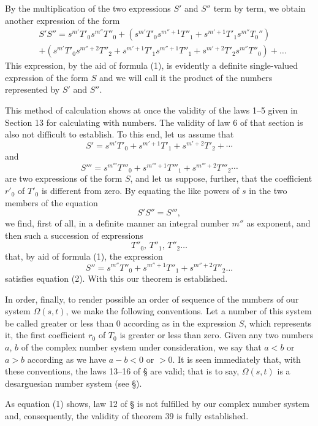 \documentclass[11pt,oneside]{book}
\begin{document}
By the multiplication of the two expressions $S'$ and
$S''$ term by term, we obtain another expression of the
form
\begin{equation*}
\begin{split}
 &S'S'' = s^{m'}T'_0 s^{m''} T''_0
 + (s^{m'} T'_0 s^{m''+1} T''_1
 + s^{m'+1} T'_1 s^{m''} T_0'')\\
 &+ (s^{m'} T'_0 s^{m''+2} T''_2
 + s^{m'+1} T'_1 s^{m''+1}T''_1
 + s^{m'+2} T'_2 s^{m''} T''_0) + \ldots
\end{split}
\end{equation*}
This expression, by the aid of formula (1), is evidently
a definite single-valued expression of the form $S$ and
we will call it the product of the numbers represented
by $S'$ and $S''$.

This method of calculation shows at once the validity
of the laws 1--5 given in Section 13 for calculating with
numbers. The validity of law 6 of that section is also
not difficult to establish. To this end, let us assume
that
\[
S'=s^{m'}T'_0+s^{m'+1}T'_1+s^{m'+2}T'_2+ \cdots
\]
and
\[
S'''=s^{m'''}T'''_0+s^{m'''+1}T'''_1+s^{m'''+2}T'''_2 \cdots
\]
are two expressions of the form $S$, and let us suppose,
further, that the coefficient $r'_0$ of $T'_0$ is different from
zero. By equating the like powers of $s$ in the two
members of the equation
\[
S'S''=S''',
\]
we find, first of all, in a definite manner an integral
number $m''$ as exponent, and then such a succession
of expressions
\[
T''_0 \text{, } T''_1 \text{, } T''_2 \ldots
\]
that, by aid of formula (1), the expression
\[
S''=s^{m''}T''_0+s^{m''+1}T''_1+s^{m''+2}T''_2 \dots
\]
satisfies equation (2). With this our theorem is established.

In order, finally, to render possible an order of sequence
of the numbers of our system $\Omega(s, t)$, we make
the following conventions. Let a number of this system
be called greater or less than 0 according as in
the expression $S$, which represents it, the first coefficient
$r_0$ of $T_0$ is greater or less than zero. Given any
two numbers $a$, $b$ of the complex number system under
consideration, we say that $a<b$ or $a>b$ according as
\label{folio106}
we have $a-b < 0$ or $> 0$. It is seen immediately that,
with these conventions, the laws 13--16 of \S{} are
valid; that is to say, $\Omega (s, t)$ is a desarguesian number
system (see \S{}).

As equation (1) shows, law 12 of \S{} is not
fulfilled by our complex number system and,
consequently, the validity of theorem 39 is fully established.
\end{document}
